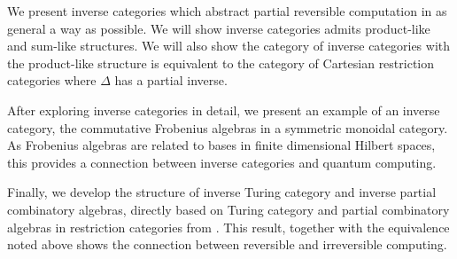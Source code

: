 We present inverse categories which abstract partial reversible computation in as general a way as
possible. We will show inverse categories admits product-like and sum-like structures. We will also
show the category of inverse categories with the product-like structure is equivalent to the
category of Cartesian restriction categories where $\Delta$ has a partial inverse.

After exploring inverse categories in detail, we present an example of an inverse category,
the commutative Frobenius algebras in a symmetric monoidal category. As Frobenius algebras are
related to bases in finite dimensional Hilbert spaces\cite{coeckeetal08:ortho}, this provides a
connection between inverse categories and quantum computing.

Finally, we develop the structure of inverse Turing category and inverse partial combinatory
algebras, directly based on Turing category and partial combinatory algebras in restriction
categories from
\cite{cockett-hostra08-intro-to-turing,cockett2010:categories-and-computability}. This result,
together with the equivalence noted above shows the connection between reversible and irreversible
computing.




